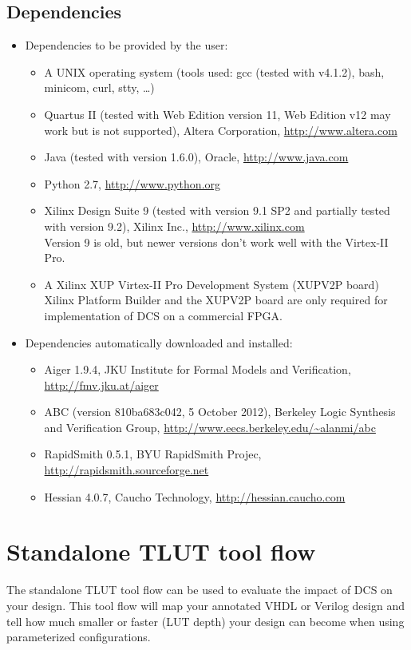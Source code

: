 \documentclass[a4paper,oneside]{memoir}
\begin{document}
\section{Dependencies}
\begin{itemize}
\item Dependencies to be provided by the user:
\begin{itemize}
\item A UNIX operating system (tools used: gcc (tested with v4.1.2), bash, minicom, curl, stty, \dots)
\item Quartus II (tested with Web Edition version 11, Web Edition v12 may work but is not supported), Altera Corporation, \url{http://www.altera.com}
\item Java (tested with version 1.6.0), Oracle, \url{http://www.java.com}
\item Python 2.7, \url{http://www.python.org}
\item Xilinx Design Suite 9 (tested with version 9.1 SP2 and partially tested with version 9.2), Xilinx Inc., \url{http://www.xilinx.com}\\
Version 9 is old, but newer versions don't work well with the Virtex-II Pro.
\item A Xilinx XUP Virtex-II Pro Development System (XUPV2P board)\\
Xilinx Platform Builder and the XUPV2P board are only required for implementation of DCS on a commercial FPGA. 
\end{itemize}
\item Dependencies automatically downloaded and installed:
\begin{itemize}
\item Aiger 1.9.4, JKU Institute for Formal Models and Verification, \url{http://fmv.jku.at/aiger}
\item ABC (version 810ba683c042, 5 October 2012), Berkeley Logic Synthesis and Verification Group, \url{http://www.eecs.berkeley.edu/\~alanmi/abc}
\item RapidSmith 0.5.1, BYU RapidSmith Projec,  \url{http://rapidsmith.sourceforge.net}
\item Hessian 4.0.7, Caucho Technology, \url{http://hessian.caucho.com}
\end{itemize}
\end{itemize}

\clearpage
\chapter{Standalone TLUT tool flow}\label{sec:standalone_flow}
The standalone TLUT tool flow can be used to evaluate the impact of DCS on your design. This tool flow will map your annotated VHDL or Verilog design and tell how much smaller or faster (LUT depth) your design can become when using parameterized configurations.
\end{document}
